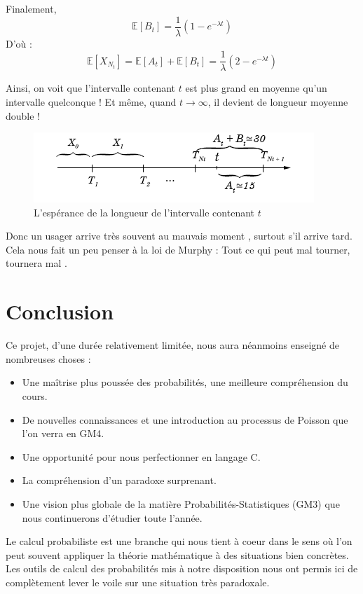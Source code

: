 \documentclass[a4paper, titlepage]{livret} %
\begin{document}
			Finalement,
			\[\boxed{
				\mathbb{E}[B_{t}] = \frac{1}{\lambda}(1 - e^{-\lambda t})
			}\]
			D'où :
			\[\boxed{
				\mathbb{E}[X_{N_{t}}] = \mathbb{E}[A_{t}] + \mathbb{E}[B_{t}] = \frac{1}{\lambda}(2 - e^{-\lambda t})
			}\]


			Ainsi, on voit que l'intervalle contenant $t$ est plus grand en moyenne qu'un intervalle quelconque !
			Et même, quand $t \rightarrow \infty$, il devient de longueur moyenne double !
			\begin{figure}[!ht]
				\centering
  					\includegraphics[scale=0.6]{g6.png}
  					\caption{L'espérance de la longueur de l'intervalle contenant $t$}
			\end{figure}

			Donc un usager arrive très souvent \og au mauvais moment \fg, surtout s'il arrive tard.
			Cela nous fait un peu penser à la loi de Murphy : \og Tout ce qui peut mal tourner, tournera mal \fg.

	
	\chapter*{Conclusion}
		Ce projet, d'une durée relativement limitée, nous aura néanmoins enseigné de nombreuses choses :
		\begin{itemize}
			\item Une maîtrise plus poussée des probabilités, une meilleure compréhension du cours.
			\item De nouvelles connaissances et une introduction au processus de Poisson que l'on verra en GM4.
			\item Une opportunité pour nous perfectionner en langage C.
			\item La compréhension d'un paradoxe surprenant.
			\item Une vision plus globale de la matière Probabilités-Statistiques (GM3) que nous continuerons d'étudier toute l'année.
		\end{itemize}

		Le calcul probabiliste est une branche qui nous tient à coeur dans le sens où l'on peut souvent appliquer la théorie mathématique à des situations bien concrètes.
		Les outils de calcul des probabilités mis à notre disposition nous ont permis ici de complètement lever le voile sur une situation très paradoxale.
\end{document}
